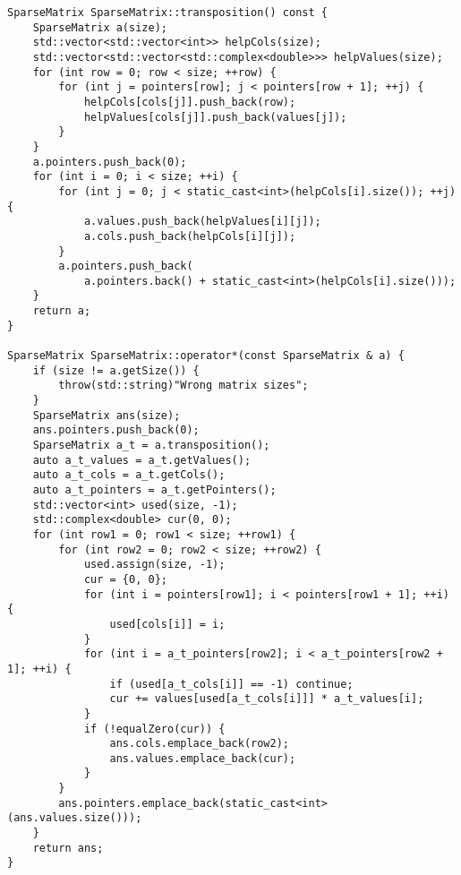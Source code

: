 \documentclass{report}
\begin{document}
\begin{lstlisting}
SparseMatrix SparseMatrix::transposition() const {
    SparseMatrix a(size);
    std::vector<std::vector<int>> helpCols(size);
    std::vector<std::vector<std::complex<double>>> helpValues(size);
    for (int row = 0; row < size; ++row) {
        for (int j = pointers[row]; j < pointers[row + 1]; ++j) {
            helpCols[cols[j]].push_back(row);
            helpValues[cols[j]].push_back(values[j]);
        }
    }
    a.pointers.push_back(0);
    for (int i = 0; i < size; ++i) {
        for (int j = 0; j < static_cast<int>(helpCols[i].size()); ++j) {
            a.values.push_back(helpValues[i][j]);
            a.cols.push_back(helpCols[i][j]);
        }
        a.pointers.push_back(
            a.pointers.back() + static_cast<int>(helpCols[i].size()));
    }
    return a;
}

SparseMatrix SparseMatrix::operator*(const SparseMatrix & a) {
    if (size != a.getSize()) {
        throw(std::string)"Wrong matrix sizes";
    }
    SparseMatrix ans(size);
    ans.pointers.push_back(0);
    SparseMatrix a_t = a.transposition();
    auto a_t_values = a_t.getValues();
    auto a_t_cols = a_t.getCols();
    auto a_t_pointers = a_t.getPointers();
    std::vector<int> used(size, -1);
    std::complex<double> cur(0, 0);
    for (int row1 = 0; row1 < size; ++row1) {
        for (int row2 = 0; row2 < size; ++row2) {
            used.assign(size, -1);
            cur = {0, 0};
            for (int i = pointers[row1]; i < pointers[row1 + 1]; ++i) {
                used[cols[i]] = i;
            }
            for (int i = a_t_pointers[row2]; i < a_t_pointers[row2 + 1]; ++i) {
                if (used[a_t_cols[i]] == -1) continue;
                cur += values[used[a_t_cols[i]]] * a_t_values[i];
            }
            if (!equalZero(cur)) {
                ans.cols.emplace_back(row2);
                ans.values.emplace_back(cur);
            }
        }
        ans.pointers.emplace_back(static_cast<int>(ans.values.size()));
    }
    return ans;
}


\end{lstlisting}
\end{document}
